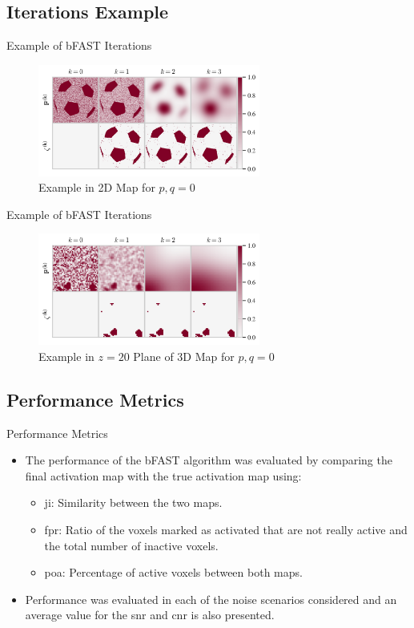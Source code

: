 \documentclass{beamer}
\begin{document}
\subsection{Iterations Example}

\begin{frame}{Example of bFAST Iterations}
\begin{figure}
\centering
\includegraphics[width=0.65\textwidth]{Images/bfastEx2D.png}
\caption{Example in 2D Map for $p,q=0$}
\end{figure}
\end{frame}

\begin{frame}{Example of bFAST Iterations}
\begin{figure}
\centering
\includegraphics[width=0.65\textwidth]{Images/bfastEx3D.png}
\caption{Example in $z=20$ Plane of 3D Map for $p,q=0$}
\end{figure}
\end{frame}

\subsection{Performance Metrics}

\begin{frame}{Performance Metrics}
\begin{itemize}
\item The performance of the bFAST algorithm was evaluated by comparing 
the final activation map with the true activation map using:
\begin{itemize}
\item \gls{ji}: Similarity between the two maps.
\item \gls{fpr}: Ratio of the voxels marked as activated that are not 
really active and the total number of inactive voxels.
\item \gls{poa}: Percentage of active voxels between both maps.
\end{itemize}
\item Performance was evaluated in each of the noise scenarios considered 
and an average value for the \gls{snr} and \gls{cnr} is also presented. 
\end{itemize}
\end{frame}
\end{document}

